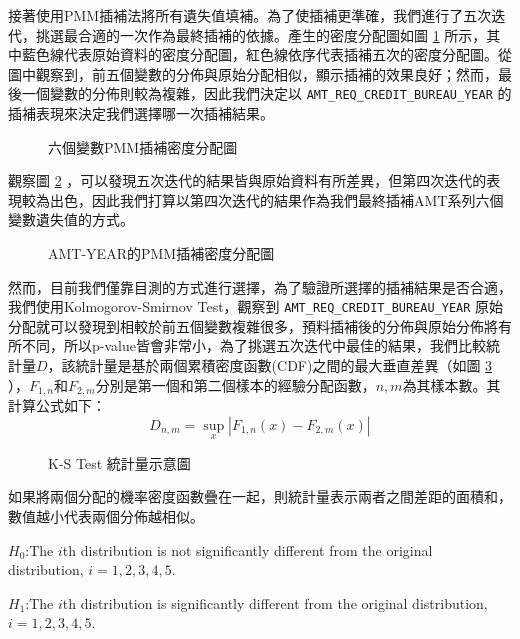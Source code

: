 \documentclass[12pt, a4paper]{article}
\begin{document}
\begin{enumerate}
\begin{enumerate}
接著使用PMM插補法將所有遺失值填補。為了使插補更準確，我們進行了五次迭代，挑選最合適的一次作為最終插補的依據。產生的密度分配圖如圖 \ref{fig:六個變數PMM插補密度分配圖} 所示，其中藍色線代表原始資料的密度分配圖，紅色線依序代表插補五次的密度分配圖。從圖中觀察到，前五個變數的分佈與原始分配相似，顯示插補的效果良好；然而，最後一個變數的分佈則較為複雜，因此我們決定以 \verb|AMT_REQ_CREDIT_BUREAU_YEAR| 的插補表現來決定我們選擇哪一次插補結果。

\begin{figure}[h]
    \caption{六個變數PMM插補密度分配圖}
    \label{fig:六個變數PMM插補密度分配圖}
\end{figure}

觀察圖 \ref{fig:AMT-YEAR的PMM插補密度分配圖} ，可以發現五次迭代的結果皆與原始資料有所差異，但第四次迭代的表現較為出色，因此我們打算以第四次迭代的結果作為我們最終插補AMT系列六個變數遺失值的方式。

\begin{figure}[h]
    \caption{AMT-YEAR的PMM插補密度分配圖}
    \label{fig:AMT-YEAR的PMM插補密度分配圖}
\end{figure}

然而，目前我們僅靠目測的方式進行選擇，為了驗證所選擇的插補結果是否合適，我們使用Kolmogorov-Smirnov Test，觀察到 \verb|AMT_REQ_CREDIT_BUREAU_YEAR| 原始分配就可以發現到相較於前五個變數複雜很多，預料插補後的分佈與原始分佈將有所不同，所以p-value皆會非常小，為了挑選五次迭代中最佳的結果，我們比較統計量$D$，該統計量是基於兩個累積密度函數(CDF)之間的最大垂直差異（如圖 \ref{fig:K-S Test 統計量示意圖} ），$F_{1,n}$和$F_{2,m}$分別是第一個和第二個樣本的經驗分配函數，$n,m$為其樣本數。其計算公式如下：
$$D_{n,m}=\sup _{x}\left|F_{1,n}(x)-F_{2,m}(x)\right|$$

\begin{figure}[h]
    \caption{K-S Test 統計量示意圖}
    \label{fig:K-S Test 統計量示意圖}
\end{figure}
如果將兩個分配的機率密度函數疊在一起，則統計量表示兩者之間差距的面積和，數值越小代表兩個分佈越相似。

$H_0$:The $i$th distribution is not significantly different from the original distribution, $i=1,2,3,4,5$.

$H_1$:The $i$th distribution is significantly different from the original distribution, $i=1,2,3,4,5$.


\end{enumerate}
\end{enumerate}
\end{document}

